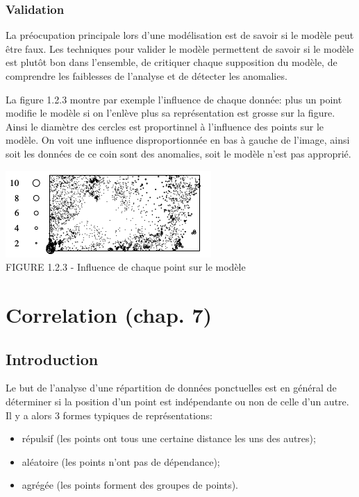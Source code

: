 \documentclass[french,12pt,a4paper]{report}
\begin{document}
\subsection{Validation}

La préocupation principale lors d'une modélisation est de savoir si le modèle peut être faux. Les techniques pour valider le modèle permettent de savoir si le modèle est plutôt bon dans l'ensemble, de critiquer chaque supposition du modèle, de comprendre les faiblesses de l'analyse et de détecter les anomalies.\\

\begin{minipage}[c]{0.45\linewidth}
La figure 1.2.3 montre par exemple l'influence de chaque donnée: plus un point modifie le modèle si on l'enlève plus sa représentation est grosse sur la figure. Ainsi le diamètre des cercles est proportinnel à l'influence des points sur le modèle. On voit une influence disproportionnée en bas à gauche de l'image, ainsi soit les données de ce coin sont des anomalies, soit le modèle n'est pas approprié.
\end{minipage}
\hfill
\begin{minipage}[c]{0.45\linewidth}
\includegraphics[scale=0.8]{images/validation.png}\\
\small{FIGURE 1.2.3 - Influence de chaque point sur le modèle}
\end{minipage}


\chapter{Correlation (chap. 7)}

\section{Introduction}

Le but de l'analyse d'une répartition de données ponctuelles est en général de déterminer si la position d'un point est indépendante ou non de celle d'un autre. Il y a alors 3 formes typiques de représentations:
\begin{itemize}
\item répulsif (les points ont tous une certaine distance les uns des autres);
\item aléatoire (les points n'ont pas de dépendance);
\item agrégée (les points forment des groupes de points).\\
\end{itemize}
\end{document}
